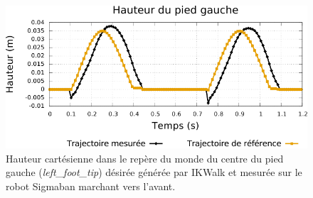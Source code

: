 \begin{figure}[htb!]
    \begin{center}
        \includegraphics[type=pdf,ext=.pdf,read=.pdf,width=0.9\linewidth]{../plot/walk_time_foot}
        \caption{\label{fig:walk_time_foot} 
            Hauteur cartésienne dans le repère du monde 
            du centre du pied gauche (\textit{left\_foot\_tip})
            désirée générée par IKWalk 
            et mesurée sur le robot Sigmaban marchant vers l'avant.}
    \end{center}
\end{figure}

